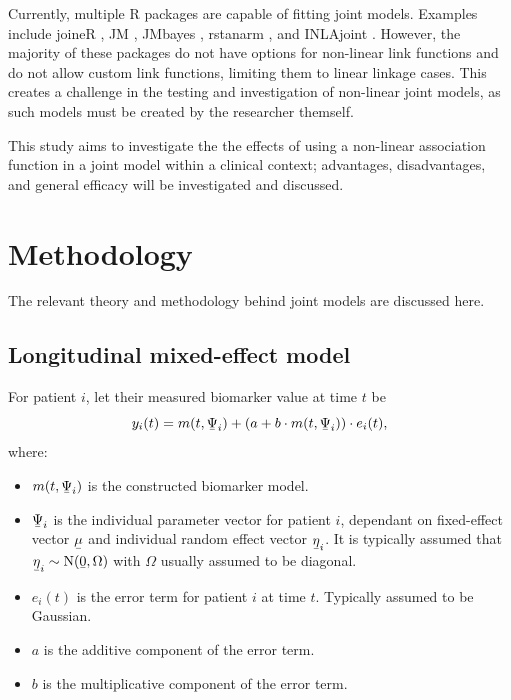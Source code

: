 \documentclass[english]{article}
\newcommand{\ubar}[1]{\text{\b{$#1$}}}
\theoremstyle{plain}
\begin{document}
Currently, multiple R packages are capable of fitting joint models. Examples include joineR \cite{joineR}, JM \cite{JM}, JMbayes \cite{jmbayes2020}, rstanarm \cite{rstanarm}, and INLAjoint \cite{joint2020}. However, the majority of these packages do not have options for non-linear link functions and do not allow custom link functions, limiting them to linear linkage cases. This creates a challenge in the testing and investigation of non-linear joint models, as such models must be created by the researcher themself.

This study aims to investigate the the effects of using a non-linear association function in a joint model within a clinical context; advantages, disadvantages, and general efficacy will be investigated and discussed.







\section{Methodology}

The relevant theory and methodology behind joint models are discussed here.

\subsection{Longitudinal mixed-effect model}

For patient $i$, let their measured biomarker value at time $t$ be
\begin{equation}
y_i(t) = m(t, \ubar{\Psi}_i) + (a + b \cdot m(t, \ubar{\Psi}_i)) \cdot e_i(t),
\end{equation}
where:
\begin{itemize}
	\item $m(t, \ubar{\Psi}_i)$ is the constructed biomarker model.
	\item $\ubar{\Psi}_i$ is the individual parameter vector for patient $i$, dependant on fixed-effect vector $\ubar{\mu}$ and individual random effect vector $\ubar{\eta}_i$. It is typically assumed that $\ubar{\eta}_i \sim \textrm{N}(\ubar{0}, \Omega)$ with $\Omega$ usually assumed to be diagonal.
	\item $e_i(t)$ is the error term for patient $i$ at time $t$. Typically assumed to be Gaussian.
	\item $a$ is the additive component of the error term.
	\item $b$ is the multiplicative component of the error term.
\end{itemize}
\end{document}
